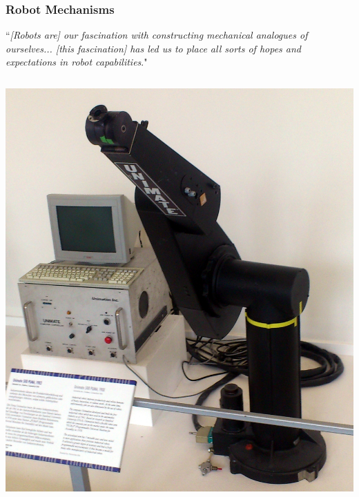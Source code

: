 \begin{frame}
	\frametitle{Robot Mechanisms}
	\begin{definition}
		``\footnotesize \textit{[Robots are] our fascination with constructing mechanical analogues of ourselves... [this fascination] has led us to place all sorts of hopes and expectations in robot capabilities}."
	\end{definition}
	\begin{columns}[t]
		\begin{column}{5cm}
			\begin{minipage}[b]{.5\textwidth}
				\includegraphics[width=1.5\textwidth, height=1.5\textwidth]{../Notes/figures/PUMA.jpg} \\

\end{minipage}
\end{column}
\end{columns}
\end{frame}
